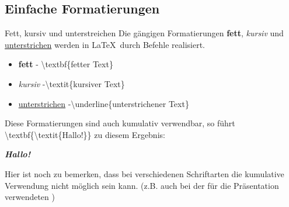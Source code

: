 \subsection{Einfache Formatierungen}
\begin{frame}{Fett, kursiv und unterstreichen}
    Die g\"angigen Formatierungen \textbf{fett}, \textit{kursiv} und \underline{unterstrichen} werden in \LaTeX~durch Befehle realisiert.
    \begin{itemize}
        \item \textbf{fett} - \color{cturkis}\textbackslash textbf\color{black}\{fetter Text\}
        \item \textit{kursiv} -\color{cturkis}\textbackslash textit\color{black}\{kursiver Text\}
        \item \underline{unterstrichen} -\color{cturkis}\textbackslash underline\color{black}\{unterstrichener Text\}
    \end{itemize}\pause
    Diese Formatierungen sind auch kumulativ verwendbar, so f\"uhrt \color{cturkis}\textbackslash textbf\color{black}\{\color{cturkis}\textbackslash textit\color{black}\{Hallo!\}\} zu diesem Ergebnis:
    \begin{center}
    \textrm{\textbf{\textit{Hallo!}}}
    \end{center}\pause
    Hier ist noch zu bemerken, dass bei verschiedenen Schriftarten die kumulative Verwendung nicht m\"oglich sein kann. (z.B. auch bei der f\"ur die Pr\"asentation verwendeten \smiley)
\end{frame}
